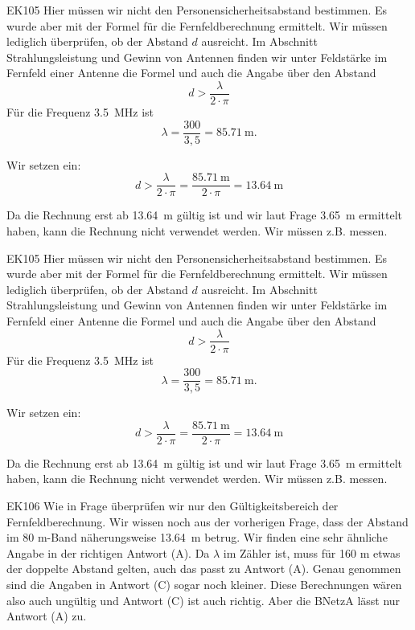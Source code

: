 \begin{sol}{EK105}
Hier müssen wir nicht den Personensicherheitsabstand bestimmen. Es wurde aber mit der Formel für die Fernfeldberechnung ermittelt. Wir müssen lediglich überprüfen, ob der Abstand $d$ ausreicht.
Im Abschnitt Strahlungsleistung und Gewinn von Antennen finden wir unter Feldstärke im Fernfeld einer Antenne die Formel und auch die Angabe über den Abstand $$d > \frac{\lambda}{2\cdot \pi}$$
Für die Frequenz \SI{3,5}{\mega\hertz} ist 
$$ \lambda = \frac{300}{3,5} = \SI{85,71}{\meter}.$$

Wir setzen ein:
$$d > \frac{\lambda}{2\cdot \pi} = \frac{\SI{85,71}{\meter}}{2\cdot \pi} = \SI{13,64}{\meter}$$

Da die Rechnung erst ab \SI{13,64}{\meter} gültig ist und wir laut Frage \SI{3,65}{\meter} ermittelt haben, kann die Rechnung nicht verwendet werden. Wir müssen z.B. messen.

\end{sol}



\begin{sol}{EK105}
Hier müssen wir nicht den Personensicherheitsabstand bestimmen. Es wurde aber mit der Formel für die Fernfeldberechnung ermittelt. Wir müssen lediglich überprüfen, ob der Abstand $d$ ausreicht.
Im Abschnitt Strahlungsleistung und Gewinn von Antennen finden wir unter Feldstärke im Fernfeld einer Antenne die Formel und auch die Angabe über den Abstand $$d > \frac{\lambda}{2\cdot \pi}$$
Für die Frequenz \SI{3,5}{\mega\hertz} ist 
$$ \lambda = \frac{300}{3,5} = \SI{85,71}{\meter}.$$

Wir setzen ein:
$$d > \frac{\lambda}{2\cdot \pi} = \frac{\SI{85,71}{\meter}}{2\cdot \pi} = \SI{13,64}{\meter}$$

Da die Rechnung erst ab \SI{13,64}{\meter} gültig ist und wir laut Frage \SI{3,65}{\meter} ermittelt haben, kann die Rechnung nicht verwendet werden. Wir müssen z.B. messen.

\end{sol}

\begin{sol}{EK106}
    Wie in Frage  überprüfen wir nur den Gültigkeitsbereich der Fernfeldberechnung. Wir wissen noch aus der vorherigen Frage, dass der Abstand im 80 m-Band näherungsweise \SI{13,64}{\meter} betrug. Wir finden eine sehr ähnliche Angabe in der richtigen Antwort (A). 
    Da $\lambda$ im Zähler ist, muss für 160 m etwas der doppelte Abstand gelten, auch das passt zu Antwort (A).
    Genau genommen sind die Angaben in Antwort (C) sogar noch kleiner. Diese Berechnungen wären also auch ungültig und Antwort (C) ist auch richtig. Aber die BNetzA lässt nur Antwort (A) zu.
\end{sol}


